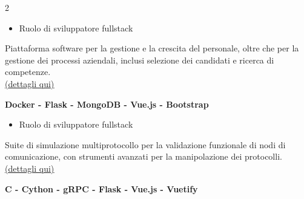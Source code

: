 \documentclass[10pt,a4paper,ragged2e,withhyper]{altacv}
\begin{document}
\begin{paracol}{2}
\begin{itemize}
    \item Ruolo di sviluppatore fullstack
\end{itemize}
Piattaforma software per la gestione e la crescita del personale, oltre che per la gestione dei processi aziendali, inclusi selezione dei candidati e ricerca di competenze. \\
\href{https://www.niering.it/software-gestionali-hr-le-nuove-funzionalita-di-matriskills/}{(\underline{dettagli qui)}}

\textbf{\small Docker - Flask - MongoDB - Vue.js - Bootstrap}

\divider

\begin{itemize}
    \item Ruolo di sviluppatore fullstack
\end{itemize}
Suite di simulazione multiprotocollo per la validazione funzionale di nodi di comunicazione, con strumenti avanzati per la manipolazione dei protocolli. \href{https://www.niering.it/case_histories/simulatore-multiprotocollo-emuxp/}{(\underline{dettagli qui)}}

\textbf{\small C - Cython - gRPC - Flask - Vue.js - Vuetify}







\\

\divider\smallskip

\\
\\
\\
\\
\\



\end{paracol}
\end{document}
